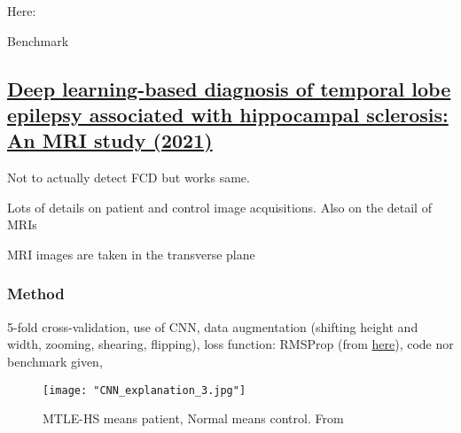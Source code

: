 Here: 

\begin{table}[htbp]
	\centering
	\caption{Benchmark}

	\caption{Results from }
	\label{tab:res5}
\end{table}

\subsection{\href{https://www.sciencedirect.com/science/article/pii/S0920121121002709\#sec0010}{Deep learning-based diagnosis of temporal lobe epilepsy associated with hippocampal sclerosis: An MRI study (2021)}}
\label{sub:sec:res6}

Not to actually detect FCD but works same.

Lots of details on patient and control image acquisitions.
Also on the detail of MRIs

MRI images are taken in the transverse plane

\subsubsection{Method}

5-fold cross-validation, 
use of CNN, 
data augmentation (shifting height and width, zooming, shearing, flipping),
loss function: RMSProp (from \href{https://www.sciencedirect.com/science/article/pii/S0920121121002709\#bib21}{here}),
code nor benchmark given,

\begin{figure}[htbp]
	\centering
	\texttt{[image: "CNN\_explanation\_3.jpg"]}
	\caption{MTLE-HS means patient, Normal means control. From }
\end{figure}

